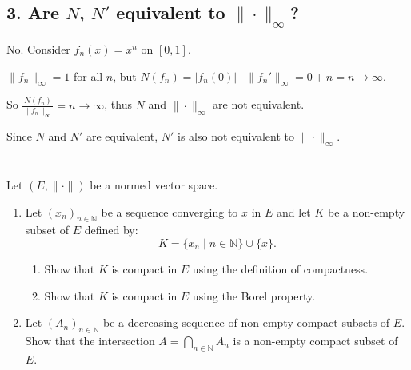 \documentclass[12pt]{article}
\begin{document}
\begin{answerbox}
\subsection*{3. Are $N$, $N'$ equivalent to $\|\cdot\|_\infty$?}

No. Consider $f_n(x) = x^n$ on $[0,1]$.

$\|f_n\|_\infty = 1$ for all $n$, but $N(f_n) = |f_n(0)| + \|f_n'\|_\infty = 0 + n = n \to \infty$.

So $\frac{N(f_n)}{\|f_n\|_\infty} = n \to \infty$, thus $N$ and $\|\cdot\|_\infty$ are not equivalent.

Since $N$ and $N'$ are equivalent, $N'$ is also not equivalent to $\|\cdot\|_\infty$.
\end{answerbox}

\section{}
Let \((E, \|\cdot\|)\) be a normed vector space.

\begin{enumerate}
    \item Let \((x_n)_{n \in \mathbb{N}}\) be a sequence converging to \( x \) in \( E \) and let \( K \) be a non-empty subset of \( E \) defined by:
    \[
    K = \{x_n \mid n \in \mathbb{N}\} \cup \{x\}.
    \]
    \begin{enumerate}
        \item Show that \( K \) is compact in \( E \) using the definition of compactness.
        \item Show that \( K \) is compact in \( E \) using the Borel property.
    \end{enumerate}
    \item Let \((A_n)_{n \in \mathbb{N}}\) be a decreasing sequence of non-empty compact subsets of \( E \). Show that the intersection \( A = \bigcap_{n \in \mathbb{N}} A_n \) is a non-empty compact subset of \( E \).
\end{enumerate}
\end{document}
